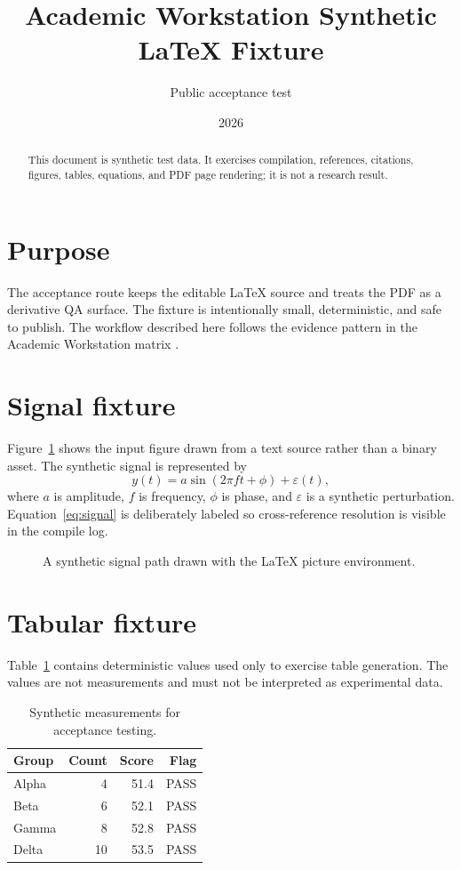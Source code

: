 \documentclass[11pt]{article}
\title{Academic Workstation Synthetic LaTeX Fixture}
\author{Public acceptance test}
\date{2026}
\begin{document}
\maketitle

\begin{abstract}
This document is synthetic test data. It exercises compilation, references, citations,
figures, tables, equations, and PDF page rendering; it is not a research result.
\end{abstract}

\section{Purpose}\label{sec:purpose}
The acceptance route keeps the editable \LaTeX{} source and treats the PDF as a derivative QA
surface. The fixture is intentionally small, deterministic, and safe to publish. The workflow
described here follows the evidence pattern in the Academic Workstation matrix
\cite{syntheticAcceptance}.

\section{Signal fixture}\label{sec:signal}
Figure~\ref{fig:path} shows the input figure drawn from a text source rather than a binary asset.
The synthetic signal is represented by
\begin{equation}
  y(t) = a\sin(2\pi f t + \phi) + \varepsilon(t),
  \label{eq:signal}
\end{equation}
where $a$ is amplitude, $f$ is frequency, $\phi$ is phase, and $\varepsilon$ is a synthetic
perturbation. Equation~\ref{eq:signal} is deliberately labeled so cross-reference resolution
is visible in the compile log.

\begin{figure}[ht]
  \centering
  
  \caption{A synthetic signal path drawn with the LaTeX picture environment.}
  \label{fig:path}
\end{figure}

\clearpage
\section{Tabular fixture}\label{sec:table}
Table~\ref{tab:measurements} contains deterministic values used only to exercise table
generation. The values are not measurements and must not be interpreted as experimental data.

\begin{table}[ht]
  \centering
  \caption{Synthetic measurements for acceptance testing.}
  \label{tab:measurements}
  \begin{tabular}{@{}lrrr@{}}
    \toprule
    Group & Count & Score & Flag \\
    \midrule
    Alpha & 4  & 51.4 & PASS \\
    Beta  & 6  & 52.1 & PASS \\
    Gamma & 8  & 52.8 & PASS \\
    Delta & 10 & 53.5 & PASS \\
    \bottomrule
  \end{tabular}
\end{table}
\end{document}
